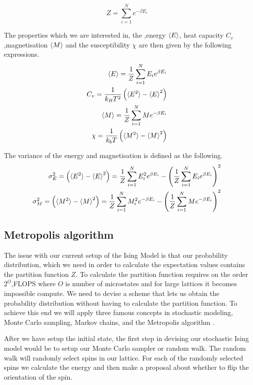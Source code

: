 \begin{equation}\label{eq:partFunc}
  Z = \sum_{i=1}^{N} e^{-\beta E_i}
\end{equation}

The properties which we are interested in, the ,energy $\braket{E}$, heat
capacity $C_v$,magnetisation $\braket{M}$ and the susceptibility $\chi$ are then given
by the following expressions.
\begin{eqnarray}
  \braket{E} = \frac{1}{Z} \sum_{i=1}^N E_i e^{\beta E_i} \\
  C_v = \frac{1}{k_B T^2}\left(\braket{E^2} - \braket{E}^2 \right) \\
  \braket{M} = \frac{1}{Z} \sum_{i=1}^{N} M e^{-\beta E_i} \\
  \chi = \frac{1}{k_b T}\left(\braket{M^2}- \braket{M}^2\right)
\end{eqnarray}

The variance of the energy and magnetisation is defined as the following.
\begin{eqnarray}
  \sigma_E^{2} = \left(\braket{E^2} - \braket{E}^2 \right) = \frac{1}{Z}
  \sum_{i=1}^N E_i^2 e^{\beta E_i} - \left(\frac{1}{Z} \sum_{i=1}^N E_i e^{\beta
  E_i}\right)^2  \\
  \sigma_M^{2} = \left(\braket{M^2}- \braket{M}^2\right) = \frac{1}{Z} \sum_{i=1}^{N} M_i^2 e^{-\beta E_i}  - \left(\frac{1}{Z} \sum_{i=1}^{N} M e^{-\beta E_i}  \right)^2
\end{eqnarray}


\subsection{Metropolis algorithm}
The issue with our current setup of the Ising Model is that our probability
distribution, which we need in order to calculate the expectation values
contains the partition function $Z$. To calculate the partition function
requires on the order $2^{O}$,FLOPS where $O$ is number of microstates and
for large lattices it becomes impossible compute. We need to devise a scheme
that lets us obtain the probability distribution without having to calculate the
partition function. To achieve this end we will apply three famous concepts in
stochastic modeling, Monte Carlo sampling, Markov chains, and the Metropolis
algorithm .

After we have setup the initial state, the first step in devising our
stochastic Ising model would be to setup our Monte Carlo sampler or random walk.
The random walk will randomly select spins in 
our lattice. For each of the randomly selected spins we calculate the energy and
then make a proposal about whether to flip the orientation of the spin. 

